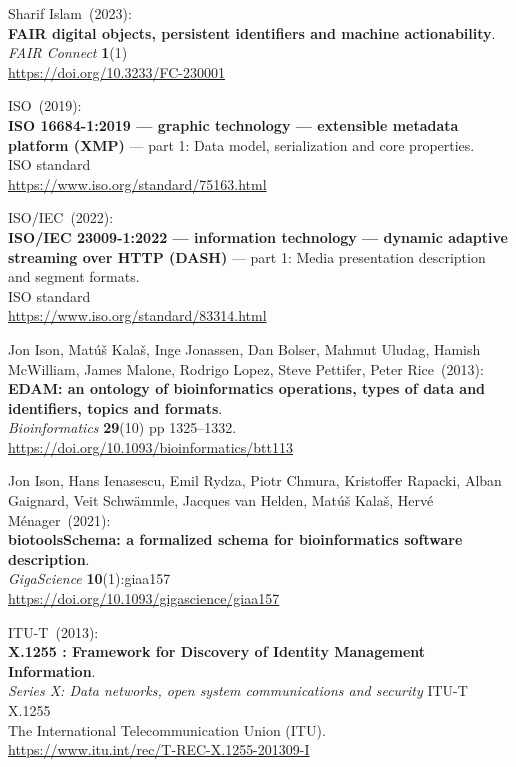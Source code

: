 \begin{thebibliography}{9}
Sharif Islam~(2023): \\
\textbf{FAIR digital objects, persistent identifiers and machine actionability}. \\
\emph{FAIR Connect} \textbf{1}(1) \\
\url{https://doi.org/10.3233/FC-230001}

ISO~(2019): \\
\textbf{{ISO} 16684-1:2019 --- graphic technology --- extensible metadata platform (XMP)} --- part 1: Data model, serialization and core properties.\\
ISO standard\\
\url{https://www.iso.org/standard/75163.html}

ISO/IEC~(2022): \\
\textbf{{ISO}/{IEC} 23009-1:2022 --- information technology ---
dynamic adaptive streaming over HTTP (DASH)} --- part 1: Media
presentation description and segment formats.\\
ISO standard\\
\url{https://www.iso.org/standard/83314.html}

Jon Ison, Matúš Kalaš, Inge Jonassen, Dan Bolser, Mahmut Uludag, Hamish McWilliam, James Malone, Rodrigo Lopez, Steve Pettifer, Peter Rice~(2013): \\
\textbf{EDAM: an ontology of bioinformatics operations, types of data and identifiers, topics and formats}.\\
\emph{Bioinformatics} \textbf{29}(10) pp 1325--1332.\\
\url{https://doi.org/10.1093/bioinformatics/btt113}

Jon Ison, Hans Ienasescu, Emil Rydza, Piotr Chmura, Kristoffer Rapacki, Alban Gaignard, Veit Schwämmle, Jacques van Helden, Matúš Kalaš, Hervé Ménager~(2021): \\
\textbf{biotoolsSchema: a formalized schema for bioinformatics software description}.\\
\emph{GigaScience} \textbf{10}(1):giaa157\\
\url{https://doi.org/10.1093/gigascience/giaa157}

ITU-T~(2013): \\
\textbf{X.1255 : Framework for Discovery of Identity Management Information}.\\
\emph{Series X: Data networks, open system communications and security} ITU-T X.1255 \\
The International Telecommunication Union (ITU).\\
\url{https://www.itu.int/rec/T-REC-X.1255-201309-I}


\end{thebibliography}
